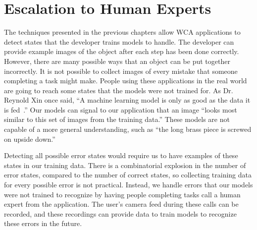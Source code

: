 \chapter{Escalation to Human Experts}\label{chap:escalation}

The techniques presented in the previous chapters allow WCA applications to
detect states that the developer trains models to handle.
The developer can provide example images of the object after each step has been
done correctly.
However, there are many possible ways that an object can be put together
incorrectly.
It is not possible to collect images of every mistake that someone completing a
task might make.
People using these
applications in the real world are going to reach some states that the models
were not trained for. As Dr. Reynold Xin once said,
``A machine learning model is only as good as the data it is fed~\cite{xin}.''
Our models can signal to our application that an image ``looks most similar to
this set of images from the training data.''
These models are not capable of a more general understanding, such as ``the long
brass piece is screwed on upside down.''

Detecting all possible error states would require us to have examples of these
states in our training data. There is a combinatorial explosion in the number of
error states, compared to the number of correct states, so collecting training
data for every possible error is not practical.
Instead, we handle errors that our models were not trained to recognize by
having people completing tasks call a human expert from the application.
The user's camera feed during these calls can be recorded, and these recordings
can provide data to train models to recognize these errors in the future.



